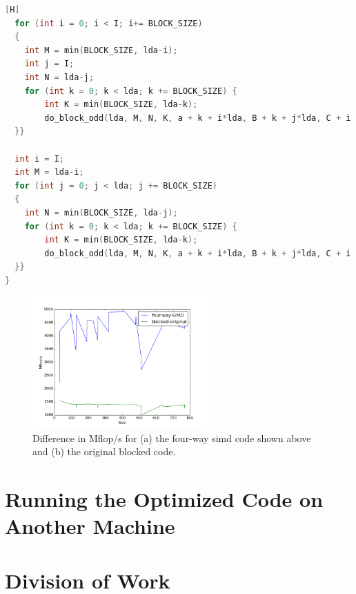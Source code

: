 \documentclass[10pt]{article}
\begin{document}
\begin{lstlisting}[language=C, basicstyle=\small][H]
  for (int i = 0; i < I; i+= BLOCK_SIZE)
  {
    int M = min(BLOCK_SIZE, lda-i);
    int j = I;
    int N = lda-j;
    for (int k = 0; k < lda; k += BLOCK_SIZE) {
        int K = min(BLOCK_SIZE, lda-k);
        do_block_odd(lda, M, N, K, a + k + i*lda, B + k + j*lda, C + i + j*lda);
  }}

  int i = I;
  int M = lda-i;
  for (int j = 0; j < lda; j += BLOCK_SIZE)
  {
    int N = min(BLOCK_SIZE, lda-j);
    for (int k = 0; k < lda; k += BLOCK_SIZE) {
        int K = min(BLOCK_SIZE, lda-k);
        do_block_odd(lda, M, N, K, a + k + i*lda, B + k + j*lda, C + i + j*lda);
  }}
}
\end{lstlisting}

\begin{figure}[H]
\centering
\includegraphics[width=0.6\textwidth]{figures/four-way-simd.png}
\caption{Difference in Mflop/s for (a) the four-way \gls{simd} code shown above and (b) the original blocked code.}
\label{fig:7}
\end{figure}

\section{Running the Optimized Code on Another Machine}

\section{Division of Work}
\end{document}
